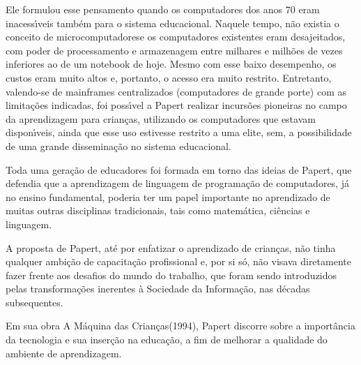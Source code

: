 \documentclass[
12pt,		%
openright,	%
twoside,  %
a4paper,			%
chapter=TITLE,		%
english,			%
french,				%
spanish,			%
brazil				%
]{USPSC-classe/USPSC_RedarTex}
\begin{document}
Ele formulou esse pensamento quando os computadores dos anos 70 eram inacess\'{\i}veis tamb\'em para o sistema educacional. Naquele tempo, n\~ao existia o conceito de \textquotedbl microcomputadores\textquotedbl  e os computadores existentes eram desajeitados, com poder de processamento e armazenagem entre milhares e milh\~oes de vezes inferiores ao de um notebook de hoje. Mesmo com esse baixo desempenho, os custos eram muito altos e, portanto, o acesso era muito restrito. Entretanto, valendo-se de mainframes centralizados (computadores de grande porte) com as limita\c{c}\~oes indicadas, foi poss\'{\i}vel a Papert realizar incurs\~oes pioneiras no campo da aprendizagem para crian\c{c}as, utilizando os computadores que estavam dispon\'{\i}veis, ainda que esse uso estivesse restrito a uma elite, sem, a possibilidade de uma grande dissemina\c{c}\~ao no sistema educacional.










Toda uma gera\c{c}\~ao de educadores foi formada em torno das ideias de Papert, que defendia que a aprendizagem de linguagem de programa\c{c}\~ao de computadores, j\'a no ensino fundamental, poderia ter um papel importante no aprendizado de muitas outras disciplinas tradicionais, tais como matem\'atica, ci\^encias e linguagem.










A proposta de Papert, at\'e por enfatizar o aprendizado de crian\c{c}as, n\~ao tinha qualquer ambi\c{c}\~ao de capacita\c{c}\~ao profissional e, por si s\'o, n\~ao visava diretamente fazer frente aos desafios do \textquotedbl mundo do trabalho\textquotedbl , que foram sendo introduzidos pelas transforma\c{c}\~oes inerentes \`a Sociedade da Informa\c{c}\~ao, nas d\'ecadas subsequentes.










Em sua obra \textquotedbl A M\'aquina das Crian\c{c}as\textquotedbl  (1994), Papert discorre sobre a import\^ancia da tecnologia e sua inser\c{c}\~ao na educa\c{c}\~ao, a fim de melhorar a qualidade do ambiente de aprendizagem.
\end{document}

